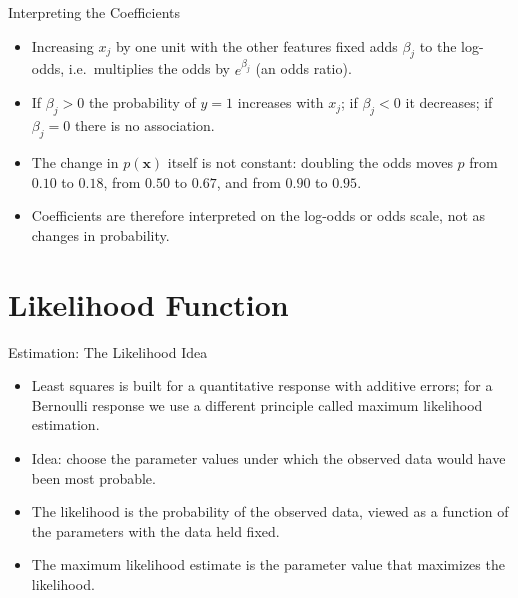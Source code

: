 \begin{frame}{Interpreting the Coefficients}
    \begin{itemize}
        \item Increasing $x_j$ by one unit with the other features fixed adds $\beta_j$ to the log-odds, i.e.\ multiplies the odds by $e^{\beta_j}$ (an odds ratio).
        \item If $\beta_j > 0$ the probability of $y = 1$ increases with $x_j$; if $\beta_j < 0$ it decreases; if $\beta_j = 0$ there is no association.
        \item The change in $p(\mathbf{x})$ itself is not constant: doubling the odds moves $p$ from $0.10$ to $0.18$, from $0.50$ to $0.67$, and from $0.90$ to $0.95$.
        \item Coefficients are therefore interpreted on the log-odds or odds scale, not as changes in probability.
    \end{itemize}
\end{frame}


\section{Likelihood Function}


\begin{frame}{Estimation: The Likelihood Idea}
    \begin{itemize}
        \item Least squares is built for a quantitative response with additive errors; for a Bernoulli response we use a different principle called maximum likelihood estimation.
        \item Idea: choose the parameter values under which the observed data would have been most probable.
        \item The likelihood is the probability of the observed data, viewed as a function of the parameters with the data held fixed.
        \item The maximum likelihood estimate is the parameter value that maximizes the likelihood.
    \end{itemize}
\end{frame}


